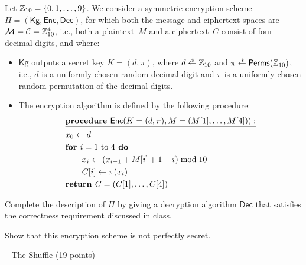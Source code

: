 \documentclass{homework}
\def\Kg{{\mathsf{Kg}}}
\def\Enc{{\mathsf{Enc}}}
\def\Dec{{\mathsf{Dec}}}
\def\Perms{{\mathsf{Perms}}}
\begin{document}
Let ${{\mathbb{Z}}_{10}=\{0,1,\dots,9\}}$.
We consider a symmetric encryption scheme ${\Pi=(\Kg,\Enc,\Dec)}$, for which both the message and ciphertext spaces are
${{\mathcal{M}}={\mathcal{C}}={\mathbb{Z}}_{10}^4}$, i.e.,
both a plaintext~$M$ and a ciphertext~$C$ consist of four decimal digits, and where:
\begin{itemize}
\item $\Kg$ outputs a secret key $K = (d,\pi)$, where
${d\draws\doubleZ_{10}}$ and ${\pi\draws\Perms(\doubleZ_{10})}$,
i.e.,
$d$ is a uniformly chosen random decimal digit and
$\pi$ is a uniformly chosen random permutation of the decimal digits.
\item 
The encryption algorithm is defined by the following procedure:
\begin{align*}
&\underline{\textbf{procedure }\Enc(K=(d,\pi),M=(M[1],\dots,M[4])):}\\
&x_0\gets d\\
&\textbf{for }i=1\textup{ to }4\textbf{ do}\\
&\qquad x_i\gets(x_{i-1}+M[i]+1 - i)\bmod 10\\
&\qquad C[i]\gets\pi(x_i)\\
&\textbf{return }C=(C[1],\dots,C[4])
\end{align*}
\end{itemize}
\begin{subtasks}
\item{}
Complete the description of $\Pi$ by giving a decryption algorithm $\Dec$
that satisfies the correctness requirement discussed in class.
\item{}
Show that this encryption scheme is not perfectly secret.
\end{subtasks}


%
%
%
%

 -- The Shuffle (19 points)
\end{document}

